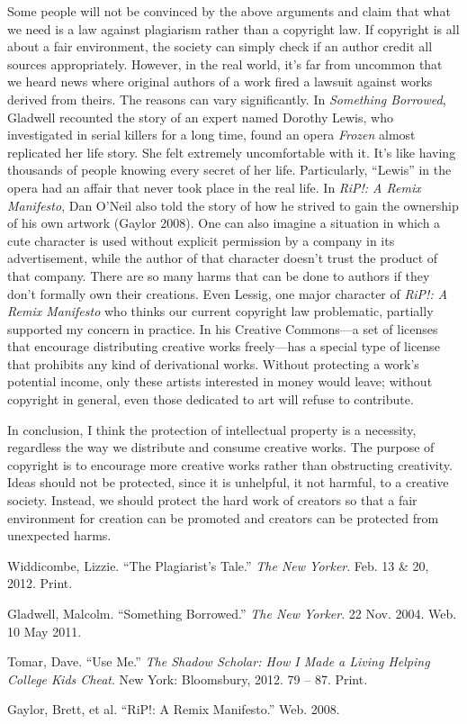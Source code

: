 \documentclass{writing}
\begin{document}
Some people will not be convinced by the above arguments and claim that
what we need is a law against plagiarism rather than a copyright law. If
copyright is all about a fair environment, the society can simply check
if an author credit all sources appropriately. However, in the real
world, it's far from uncommon that we heard news where original authors
of a work fired a lawsuit against works derived from theirs. The reasons
can vary significantly. In \emph{Something Borrowed}, Gladwell recounted
the story of an expert named Dorothy Lewis, who investigated in serial
killers for a long time, found an opera \emph{Frozen} almost replicated
her life story. She felt extremely uncomfortable with it. It's like
having thousands of people knowing every secret of her life.
Particularly, ``Lewis'' in the opera had an affair that never took place
in the real life. In \emph{RiP!: A Remix Manifesto}, Dan O'Neil also
told the story of how he strived to gain the ownership of his own
artwork (Gaylor 2008). One can also imagine a situation in which a cute
character is used without explicit permission by a company in its
advertisement, while the author of that character doesn't trust the
product of that company. There are so many harms that can be done to
authors if they don't formally own their creations. Even Lessig, one
major character of \emph{RiP!: A Remix Manifesto} who thinks our current
copyright law problematic, partially supported my concern in practice.
In his Creative Commons---a set of licenses that encourage distributing
creative works freely---has a special type of license that prohibits any
kind of derivational works. Without protecting a work's potential
income, only these artists interested in money would leave; without
copyright in general, even those dedicated to art will refuse to
contribute.

In conclusion, I think the protection of intellectual property is a
necessity, regardless the way we distribute and consume creative works.
The purpose of copyright is to encourage more creative works rather than
obstructing creativity. Ideas should not be protected, since it is
unhelpful, it not harmful, to a creative society. Instead, we should
protect the hard work of creators so that a fair environment for
creation can be promoted and creators can be protected from unexpected
harms.

\begin{references}
\item
  Widdicombe, Lizzie. ``The Plagiarist's Tale.'' \emph{The New Yorker}.
  Feb. 13 \& 20, 2012. Print.
\item
  Gladwell, Malcolm. ``Something Borrowed.'' \emph{The New Yorker}. 22
  Nov. 2004. Web. 10 May 2011.
\item
  Tomar, Dave. ``Use Me.'' \emph{The Shadow Scholar: How I Made a Living
  Helping College Kids Cheat}. New York: Bloomsbury, 2012. 79 -- 87.
  Print.
\item
  Gaylor, Brett, et al. ``RiP!: A Remix Manifesto.'' Web. 2008.
\end{references}
\end{document}
